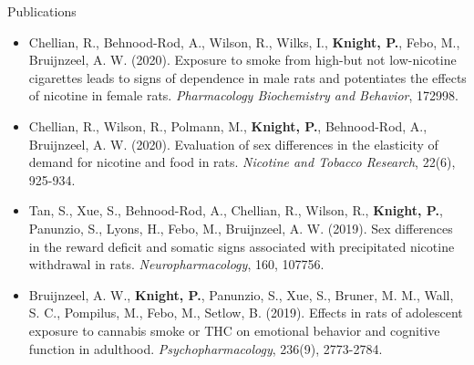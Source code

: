 \documentclass{resume}
\begin{document}
\begin{rSection}{Publications} %
  \begin{itemize}
    \item Chellian, R., Behnood-Rod, A., Wilson, R., Wilks, I.,
      \textbf{Knight, P.}, Febo, M., Bruijnzeel, A. W. (2020). Exposure to
      smoke from high-but not low-nicotine cigarettes leads to signs
      of dependence in male rats and potentiates the effects of
      nicotine in female rats. \textit{Pharmacology Biochemistry and Behavior},
      172998.
    \item Chellian, R., Wilson, R., Polmann, M., \textbf{Knight, P.},
      Behnood-Rod, A., Bruijnzeel, A. W. (2020). Evaluation of sex
      differences in the elasticity of demand for nicotine and food in
      rats. \textit{Nicotine and Tobacco Research}, 22(6), 925-934.
    \item Tan, S., Xue, S., Behnood-Rod, A., Chellian, R., Wilson, R.,
      \textbf{Knight, P.}, Panunzio, S., Lyons, H., Febo, M., Bruijnzeel, A. W. (2019). Sex differences in
      the reward deficit and somatic signs associated with
      precipitated nicotine withdrawal in rats. \textit{Neuropharmacology},
      160, 107756.
    \item Bruijnzeel, A. W., \textbf{Knight, P.}, Panunzio, S., Xue, S.,
      Bruner, M. M., Wall, S. C., Pompilus, M., Febo, M., Setlow, B. (2019). Effects in
      rats of adolescent exposure to cannabis smoke or THC on
      emotional behavior and cognitive function in
      adulthood. \textit{Psychopharmacology}, 236(9), 2773-2784.
    \end{itemize}
    \end{rSection}
\end{document}
